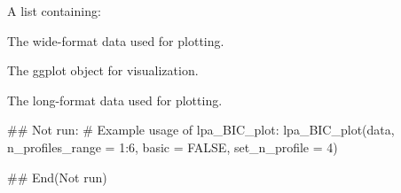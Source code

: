 \documentclass[a4paper]{book}
\begin{document}
%
\begin{Value}
A list containing:
\begin{ldescription}
\item[\code{data}] The wide-format data used for plotting.
\item[\code{graph}] The ggplot object for visualization.
\item[\code{to\_plot}] The long-format data used for plotting.
\end{ldescription}
\end{Value}
%
\begin{Examples}
\begin{ExampleCode}
\#\# Not run: 
# Example usage of lpa_BIC_plot:
lpa_BIC_plot(data, n_profiles_range = 1:6, basic = FALSE, set_n_profile = 4)

## End(Not run)
\end{ExampleCode}
\end{Examples}
\end{document}
